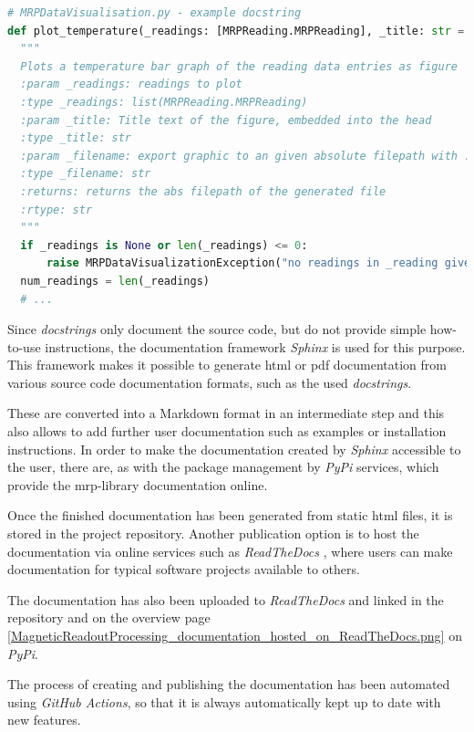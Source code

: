\begin{lstlisting}[language=Python, caption={Documentation using Python docstring example}, label=lst:pydocstring]
# MRPDataVisualisation.py - example docstring
def plot_temperature(_readings: [MRPReading.MRPReading], _title: str = '', _filename: str = None, _unit: str = "degree C") -> str:
  """
  Plots a temperature bar graph of the reading data entries as figure
  :param _readings: readings to plot
  :type _readings: list(MRPReading.MRPReading)
  :param _title: Title text of the figure, embedded into the head
  :type _title: str
  :param _filename: export graphic to an given absolute filepath with .png
  :type _filename: str
  :returns: returns the abs filepath of the generated file
  :rtype: str
  """
  if _readings is None or len(_readings) <= 0:
      raise MRPDataVisualizationException("no readings in _reading given")
  num_readings = len(_readings)
  # ...
\end{lstlisting}

Since \emph{docstrings} only document the source code, but do not
provide simple how-to-use instructions, the documentation framework
\emph{Sphinx} \cite{SphinxDocumentation} is used for this purpose.
This framework makes it possible to generate \gls{html} or \gls{pdf}
documentation from various source code documentation formats, such as
the used \emph{docstrings}.

These are converted into a Markdown format in an intermediate step and
this also allows to add further user documentation such as examples or
installation instructions. In order to make the documentation created by
\emph{Sphinx} accessible to the user, there are, as with the package
management by \emph{PyPi} services, which provide the \gls{mrp}-library
documentation online.

Once the finished documentation has been generated from static
\gls{html} files, it is stored in the project repository. Another
publication option is to host the documentation via online services such
as \emph{ReadTheDocs} \cite{ReadTheDocs}, where users can make
documentation for typical software projects available to others.

The documentation has also been uploaded to \emph{ReadTheDocs}
\cite{MagneticReadoutProcessingReadTheDocs} and linked in the
repository and on the overview page
\ref{MagneticReadoutProcessing_documentation_hosted_on_ReadTheDocs.png}
on \emph{PyPi}.

The process of creating and publishing the documentation has been
automated using \emph{GitHub Actions}, so that it is always
automatically kept up to date with new features.

